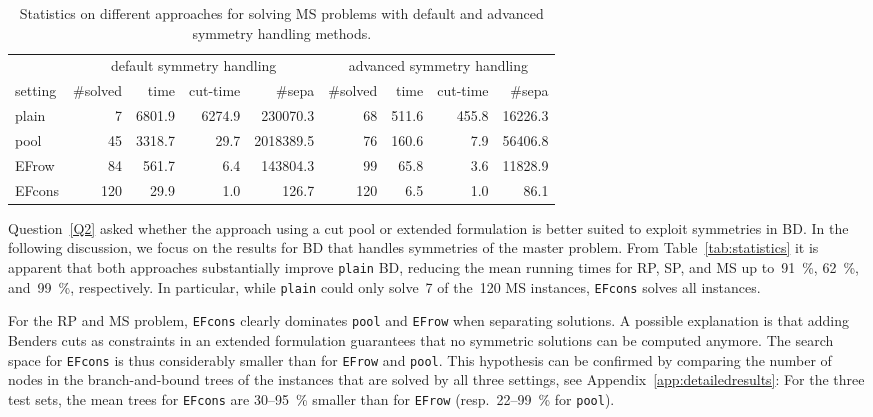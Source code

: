 \documentclass[a4paper,10pt]{article}
\newcommand{\setting}[1]{\texttt{#1}}
\newcommand{\rectanglepack}{RP\xspace}
\newcommand{\spherepack}{SP\xspace}
\newcommand{\scheduling}{MS\xspace}
\theoremstyle{definition}
\begin{document}
\begin{table}[tb]
  \caption{Statistics on different approaches for solving \scheduling problems with default and advanced symmetry handling methods.}
  \label{tab:statisticssched}
  \centering
  \begin{scriptsize}
  \begin{tabular*}{\textwidth}{@{}l@{\;\;\extracolsep{\fill}}rrrrrrrr@{}}
    \toprule
    & \multicolumn{4}{c}{default symmetry handling} & \multicolumn{4}{c}{advanced symmetry handling}\\
    \cmidrule{2-5} \cmidrule{6-9}
    setting & \#solved & time & cut-time & \#sepa & \#solved & time & cut-time & \#sepa \\
    \midrule
     plain & \num{  7} & \num{6801.9} & \num{6274.9} & \num{  230070.3} & \num{ 68} & \num{ 511.6} & \num{ 455.8} & \num{   16226.3} \\
      pool & \num{ 45} & \num{3318.7} & \num{  29.7} & \num{ 2018389.5} & \num{ 76} & \num{ 160.6} & \num{   7.9} & \num{   56406.8} \\
     EFrow & \num{ 84} & \num{ 561.7} & \num{   6.4} & \num{  143804.3} & \num{ 99} & \num{  65.8} & \num{   3.6} & \num{   11828.9} \\
    EFcons & \num{120} & \num{  29.9} & \num{   1.0} & \num{     126.7} & \num{120} & \num{   6.5} & \num{   1.0} & \num{      86.1} \\
    \bottomrule
  \end{tabular*}
  \end{scriptsize}
\end{table}

Question~\eqref{Q2} asked whether the approach using a cut pool or extended formulation is better suited to exploit symmetries in BD.
In the following discussion, we focus on the results for BD that handles symmetries of the master problem.
From Table~\ref{tab:statistics} it is apparent that both approaches substantially improve \setting{plain} BD, reducing the mean running times for \rectanglepack, \spherepack, and \scheduling up to~\SI{91}{\percent}, \SI{62}{\percent}, and~\SI{99}{\percent}, respectively.
In particular, while \setting{plain} could only solve~7 of the~120 \scheduling instances, \setting{EFcons} solves all instances.

For the \rectanglepack and \scheduling problem, \setting{EFcons} clearly dominates \setting{pool} and \setting{EFrow} when separating solutions.
A possible explanation is that adding Benders cuts as constraints in an extended formulation guarantees that no symmetric solutions can be computed anymore.
The search space for \setting{EFcons} is thus considerably smaller than for \setting{EFrow} and \setting{pool}.
This hypothesis can be confirmed by comparing the number of nodes in the branch-and-bound trees of the instances that are solved by all three settings, see Appendix~\ref{app:detailedresults}:
For the three test sets, the mean trees for \setting{EFcons} are 30--\SI{95}{\percent} smaller than for \setting{EFrow} (resp.\ 22--\SI{99}{\percent} for \setting{pool}).
\end{document}
